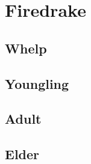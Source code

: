 \section{Firedrake}

\subsection{Whelp}

\subsection{Youngling}

\subsection{Adult}

\subsection{Elder}